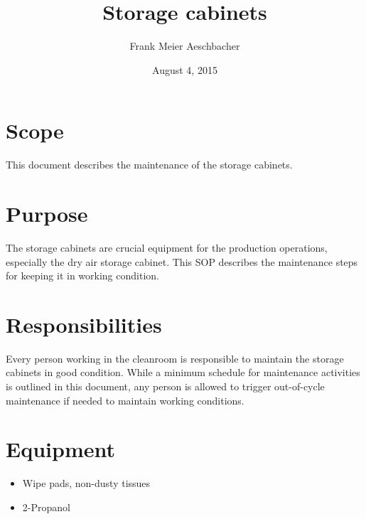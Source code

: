 \documentclass[12pt]{unlsilabsop}
\title{Storage cabinets}
\date{August 4, 2015}
\author{Frank Meier Aeschbacher}
\begin{document}
\maketitle

\section{Scope}
This document describes the maintenance of the storage cabinets.

\section{Purpose}
The storage cabinets are crucial equipment for the production operations, especially the dry air storage cabinet. This SOP describes the maintenance steps for keeping it in working condition.


\section{Responsibilities}
Every person working in the cleanroom is responsible to maintain the storage cabinets in good condition. While a minimum schedule for maintenance activities is outlined in this document, any person is allowed to trigger out-of-cycle maintenance if needed to maintain working conditions.

\section{Equipment}

\begin{itemize}
    \item Wipe pads, non-dusty tissues
    \item 2-Propanol
\end{itemize}


\end{document}
